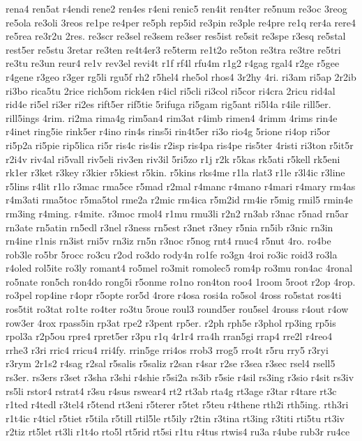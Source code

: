 {rena4
ren5at
r4endi
rene2
ren4es
r4eni
renic5
ren4it
ren4ter
re5num
re3oc
3reog
re5ola
re3oli
3reos
re1pe
re4per
re5ph
rep5id
re3pin
re3ple
re4pre
re1q
rer4a
rere4
re5rea
re3r2u
2res.
re3scr
re3sel
re3sem
re3ser
res5ist
re5sit
re3spe
r3esq
re5stal
rest5er
re5stu
3retar
re3ten
re4t4er3
re5term
re1t2o
re5ton
re3tra
re3tre
re5tri
re3tu
re3un
reur4
re1v
rev3el
revi4t
r1f
rf4l
rfu4m
r1g2
r4gag
rgal4
r2ge
r5gee
r4gene
r3geo
r3ger
rg5li
rgu5f
rh2
r5hel4
rhe5ol
rhos4
3r2hy
4ri.
ri3am
ri5ap
2r2ib
ri3bo
rica5tu
2rice
rich5om
rick4en
r4icl
ri5cli
ri3col
ri5cor
ri4cra
2ricu
rid4al
rid4e
ri5el
ri3er
ri2es
rift5er
rif5tie
5rifuga
ri5gam
rig5ant
ri5l4a
r4ile
rill5er.
rill5ings
4rim.
ri2ma
rima4g
rim5an4
rim3at
r4imb
rimen4
4rimm
4rims
rin4e
r4inet
ring5ie
rink5er
r4ino
rin4s
rins5i
rin4t5er
ri3o
rio4g
5rione
ri4op
ri5or
ri5p2a
ri5pie
rip5lica
ri5r
ris4c
ris4is
r2isp
ris4pa
ris4pe
ris5ter
4risti
ri3ton
r5it5r
r2i4v
riv4al
ri5vall
riv5eli
riv3en
riv3il
5ri5zo
r1j
r2k
r5kas
rk5ati
r5kell
rk5eni
rk1er
r3ket
r3key
r3kier
r5kiest
r5kin.
r5kins
rks4me
r1la
rlat3
r1le
r3l4ic
r3line
r5lins
r4lit
r1lo
r3mac
rma5ce
r5mad
r2mal
r4manc
r4mano
r4mari
r4mary
rm4as
r4m3ati
rma5toc
r5ma5tol
rme2a
r2mic
rm4ica
r5m2id
rm4ie
r5mig
rmil5
rmin4e
rm3ing
r4ming.
r4mite.
r3moc
rmol4
r1mu
rmu3li
r2n2
rn3ab
r3nac
r5nad
rn5ar
rn3ate
rn5atin
rn5edl
r3nel
r3ness
rn5est
r3net
r3ney
r5nia
rn5ib
r3nic
rn3in
rn4ine
r1nis
rn3ist
rni5v
rn3iz
rn5n
r3noc
r5nog
rnt4
rnuc4
r5nut
4ro.
ro4be
rob3le
ro5br
5rocc
ro3cu
r2od
ro3do
rody4n
ro1fe
ro3gn
4roi
ro3ic
roid3
ro3la
r4oled
rol5ite
ro3ly
romant4
ro5mel
ro3mit
romolec5
rom4p
ro3mu
ron4ac
4ronal
ro5nate
ron5ch
ron4do
rong5i
r5onme
ro1no
ron4ton
roo4
1room
5root
r2op
4rop.
ro3pel
rop4ine
r4opr
r5opte
ror5d
4rore
r4osa
rosi4a
ro5sol
4ross
ro5stat
ros4ti
ros5tit
ro3tat
ro1te
ro4ter
ro3tu
5roue
roul3
round5er
rou5sel
4rouss
r4out
r4ow
row3er
4rox
rpass5in
rp3at
rpe2
r3pent
rp5er.
r2ph
rph5e
r3phol
rp3ing
rp5is
rpol3a
r2p5ou
rpre4
rpret5er
r3pu
r1q
4r1r4
rra4h
rran5gi
rrap4
rre2l
r4reo4
rrhe3
r3ri
rric4
rricu4
rri4fy.
rrin5ge
rri4os
rrob3
rrog5
rro4t
r5ru
rry5
r3ryi
r3rym
2r1s2
r4sag
r2sal
r5salis
r5saliz
r2san
r4sar
r2se
r3sea
r3sec
rsel4
rsell5
rs3er.
rs3ers
r3set
r3sha
r3shi
r4shie
r5si2a
rs3ib
r5sie
r4sil
rs3ing
r3sio
r4sit
rs3iv
rs5li
rstor4
rstrat4
r3su
r4sus
rswear4
rt2
rt3ab
rta4g
rt3age
r3tar
r4tare
rt3c
r1ted
r4tedl
r3tel4
r5tend
rt3eni
r5terer
r5tet
r5teu
r4thene
rth2i
rth5ing.
rth3ri
r1t4ic
r4ticl
r5tiet
r5tila
r5till
rtil5le
rt5ily
r2tin
r3tina
rt3ing
r3titi
rti5tu
rt3iv
r2tiz
rt5let
rt3li
r1t4o
rto5l
rt5rid
rt5si
r1tu
r4tus
rtwis4
ru3a
r4ube
rub3r
ru4ce
}
